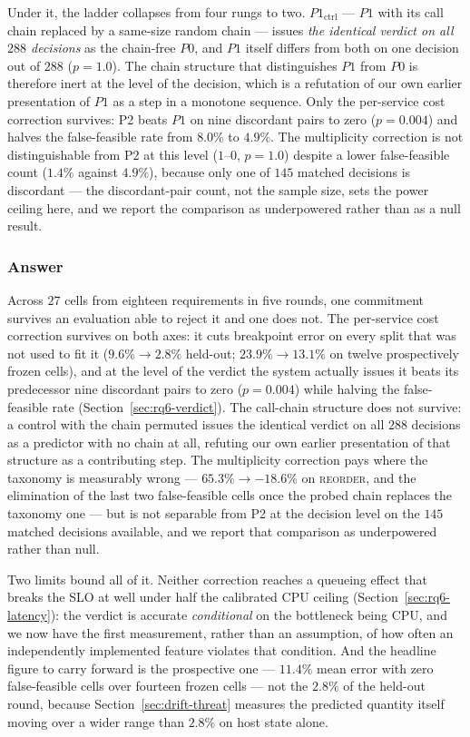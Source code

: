\documentclass[journal, 10pt]{IEEEtran}
\begin{document}
Under it, the ladder collapses from four rungs to two. $P1_{\text{ctrl}}$ ---
$P1$ with its call chain replaced by a same-size random chain --- issues
\emph{the identical verdict on all $288$ decisions} as the chain-free $P0$,
and $P1$ itself differs from both on one decision out of $288$ ($p=1.0$). The
chain structure that distinguishes $P1$ from $P0$ is therefore inert at the
level of the decision, which is a refutation of our own earlier presentation of
$P1$ as a step in a monotone sequence. Only the per-service cost correction
survives: P2 beats $P1$ on nine discordant pairs to zero ($p=0.004$) and halves
the false-feasible rate from $8.0\%$ to $4.9\%$. The multiplicity correction is
not distinguishable from P2 at this level ($1$--$0$, $p=1.0$) despite a lower
false-feasible count ($1.4\%$ against $4.9\%$), because only one of $145$
matched decisions is discordant --- the discordant-pair count, not the sample
size, sets the power ceiling here, and we report the comparison as
underpowered rather than as a null result.

\subsubsection{Answer}
Across $27$ cells from eighteen requirements in five rounds, one commitment
survives an evaluation able to reject it and one does not. The per-service cost
correction survives on both axes: it cuts breakpoint error on every split that
was not used to fit it ($9.6\%\to2.8\%$ held-out; $23.9\%\to13.1\%$ on twelve
prospectively frozen cells), and at the level of the verdict the system actually
issues it beats its predecessor nine discordant pairs to zero ($p=0.004$) while
halving the false-feasible rate (Section~\ref{sec:rq6-verdict}). The call-chain
structure does not survive: a control with the chain permuted issues the
identical verdict on all $288$ decisions as a predictor with no chain at all,
refuting our own earlier presentation of that structure as a contributing step.
The multiplicity correction pays where the taxonomy is measurably wrong ---
$65.3\%\to-18.6\%$ on \textsc{reorder}, and the elimination of the last two
false-feasible cells once the probed chain replaces the taxonomy one --- but is
not separable from P2 at the decision level on the $145$ matched decisions
available, and we report that comparison as underpowered rather than null.

Two limits bound all of it. Neither correction reaches a queueing effect that
breaks the SLO at well under half the calibrated CPU ceiling
(Section~\ref{sec:rq6-latency}): the verdict is accurate \emph{conditional} on
the bottleneck being CPU, and we now have the first measurement, rather than an
assumption, of how often an independently implemented feature violates that
condition. And the headline figure to carry forward is the prospective one ---
$11.4\%$ mean error with zero false-feasible cells over fourteen frozen cells
--- not the $2.8\%$ of the held-out round, because
Section~\ref{sec:drift-threat} measures the predicted quantity itself moving
over a wider range than $2.8\%$ on host state alone.
\end{document}
